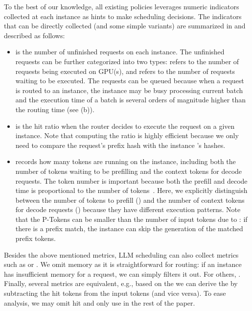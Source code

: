 \noindent
To the best of our knowledge, all existing policies
leverages numeric indicators collected at each instance as hints to make scheduling decisions.
The indicators that can be directly collected (and some simple variants) 
are summarized in {} and described as follows:  \\[-10pt]
\begin{itemize}[leftmargin=*,leftmargin=10pt,itemindent=0pt]
    \item {} is the number of unfinished requests 
        on each instance. 
        The unfinished requests can be further categorized into two types:
         refers to the number of requests being executed on GPU(s),
        and  refers to the number of requests waiting to be executed.
        The requests can be queued because when a request is routed to an instance,
        the instance may be busy processing current batch and 
        the execution time of a batch is several
        orders of magnitude higher than the routing time (see {} (b)).
        \\[-5pt]

        \item {} is the hit ratio when the router decides to execute
        the request on a given instance. Note that computing the ratio is highly efficient
        because we only need to compare the request's prefix hash with the instance {\kvcache}'s hashes.

    \item {} records how many tokens are running on the instance,
        including both the number of tokens waiting to be prefilling
        and the context tokens for decode requests.
        The token number is important because both the prefill and decode time is proportional
        to the number of tokens~\cite{DBLP:conf/osdi/ZhongLCHZL0024,DBLP:conf/osdi/ZhuGZZZGX0KLWWK25}.
        Here, we explicitly distinguish between the number of tokens to prefill
        () and the number of context tokens for decode requests
        () because they have different execution patterns.
        Note that the P-Tokens can be smaller than the number of input tokens
        due to {\kvcache}: if there is a prefix match, the instance
        can skip the generation of the matched prefix tokens. \\[-5pt]
\end{itemize}

Besides the above mentioned metrics, LLM scheduling can also collect metrics
such as  or .
We omit memory as it is straightforward for routing:
if an instance has insufficient memory for a request, we can simply filters it out.  
For others, . 
Finally, several metrics are equivalent, e.g., based on the 
we can derive the  by subtracting the hit tokens from the input tokens (and vice versa).
To ease analysis, we may omit {{\kvcache} hit} and only use  in the rest of the paper.
\fi